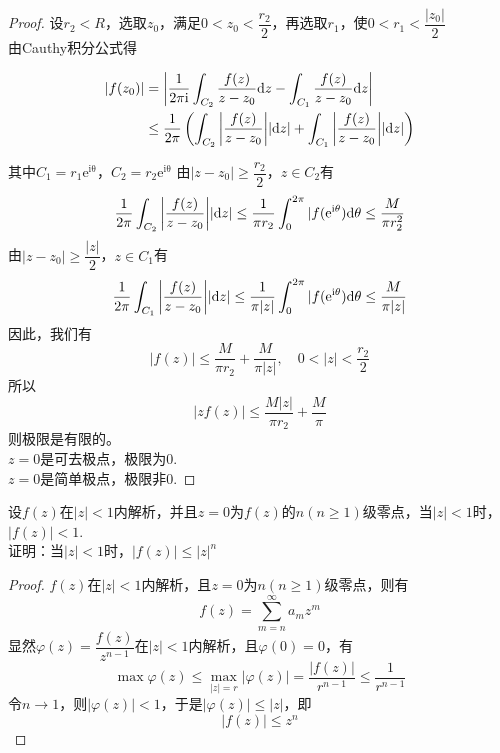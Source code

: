 \begin{proof}
    
    设$r_2 < R$，选取$z_0$，满足$0 < z_0 < \dfrac{r_2}{2}$，再选取$r_1$，使$0 < r_1 < \dfrac{|z_0|}{2}$ \\
    由\textup{Cauthy}积分公式得

    \begin{align*}
        |f(z_0)| & = \left| \dfrac{1}{2\mathrm{\pi i}} \int_{C_2}{\dfrac{f(z)}{z - z_0}}\mathrm{d} z - \int_{C_1}{\dfrac{f(z)}{z - z_0}}\mathrm{d} z \right| \\
        & \leq \dfrac{1}{2 \pi} \left( \int_{C_2}{\left| \dfrac{f(z)}{z - z_0} \right|}|\mathrm{d} z| + \int_{C_1}{\left| \dfrac{f(z)}{z - z_0} \right|}|\mathrm{d} z| \right)
    \end{align*}

    其中$C_1 = r_1\mathrm{e^{i\theta}}$，$C_2 = r_2\mathrm{e^{i\theta}}$
    由$|z - z_0| \geq \dfrac{r_2}{2}$，$z \in C_2$有
    \[ \dfrac{1}{2 \pi} \int_{C_2}{\left| \dfrac{f(z)}{z - z_0} \right|}|\mathrm{d} z| \leq \dfrac{1}{ \pi r_2}\int_{0}^{2 \pi}{|f(\mathrm{e}^{\mathrm{i}\theta})}\mathrm{d} \theta \leq \dfrac{M}{ \pi r_2^2}\]
    由$|z - z_0| \geq \dfrac{|z|}{2}$，$z \in C_1$有
    \[ \dfrac{1}{2 \pi} \int_{C_1}{\left| \dfrac{f(z)}{z - z_0} \right|}|\mathrm{d} z| \leq \dfrac{1}{ \pi|z|}\int_{0}^{2 \pi}{|f(\mathrm{e}^{\mathrm{i}\theta})}\mathrm{d} \theta \leq \dfrac{M}{ \pi|z|}\]
    因此，我们有
    \[|f(z)| \leq \dfrac{M}{ \pi r_2} + \dfrac{M}{ \pi|z|}, \quad 0 < |z| < \dfrac{r_2}{2}\]
    所以\[|zf(z)| \leq \dfrac{M|z|}{ \pi r_2} + \dfrac{M}{\pi}\]
    则极限是有限的。\\
    $z = 0$是可去极点，极限为$0$. \\
    $z = 0$是简单极点，极限非$0$.

\end{proof}

\begin{proposition}

    设$f(z)$在$|z| < 1 $内解析，并且$z = 0$为$f(z)$的$n(n \geq 1)$级零点，当$|z| < 1$时，$|f(z)| < 1$. \\
    证明：当$|z| < 1$时，$|f(z)| \leq |z|^n$

\end{proposition}

\begin{proof}
    
    $f(z)$在$|z| < 1$内解析，且$z = 0$为$n(n \geq 1)$级零点，则有
    \[f(z) = \sum\limits_{m = n}^{\infty}{a_mz^m}\]
    显然$\varphi(z) = \dfrac{f(z)}{z^{n - 1}}$在$|z| < 1$内解析，且$\varphi(0) = 0$，有
    \[ \max\varphi(z) \leq \max_{|z| = r}|\varphi(z)| = \dfrac{|f(z)|}{r^{n - 1}} \leq \dfrac{1}{r^{n - 1}} \]
    令$n \to 1$，则$|\varphi(z)| < 1$，于是$|\varphi(z)| \leq |z|$，即
    \[|f(z)| \leq z^n\]

\end{proof}

